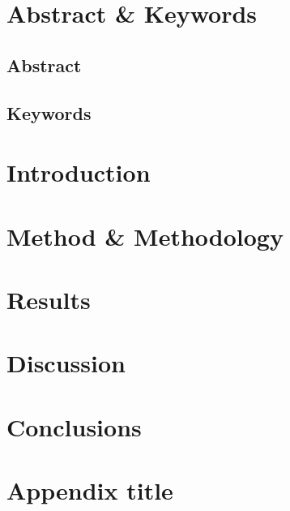 \documentclass{bcrre_assignment}
\begin{document}

\maketitle

\justifying %

\section*{Abstract \& Keywords}  


\subsection*{Abstract}


\subsection*{Keywords}


\section{Introduction}
\parencite{elliott2014} %


\section{Method \& Methodology}


\section{Results}


\section{Discussion}


\section{Conclusions}


\printbibliography

\appendix
\section{Appendix title}
\end{document}
